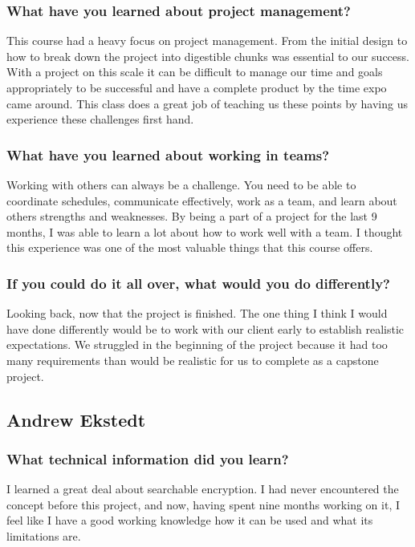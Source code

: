 \subsubsection{What have you learned about project management?}
This course had a heavy focus on project management. From the initial design to how to break down the project into digestible chunks was essential to our success. With a project on this scale it can be difficult to manage our time and goals appropriately to be successful and have a complete product by the time expo came around. This class does a great job of teaching us these points by having us experience these challenges first hand.

\subsubsection{What have you learned about working in teams?}
Working with others can always be a challenge. You need to be able to coordinate schedules, communicate effectively, work as a team, and learn about others strengths and weaknesses. By being a part of a project for the last 9 months, I was able to learn a lot about how to work well with a team. I thought this experience was one of the most valuable things that this course offers.

\subsubsection{If you could do it all over, what would you do differently?}
Looking back, now that the project is finished. The one thing I think I would have done differently would be to work with our client early to establish realistic expectations. We struggled in the beginning of the project because it had too many requirements than would be realistic for us to complete as a capstone project.

\subsection{Andrew Ekstedt}
\subsubsection{What technical information did you learn?}

I learned a great deal about searchable encryption. I had never encountered the concept before this project, and now, having spent nine months working on it, I feel like I have a good working knowledge how it can be used and what its limitations are.

